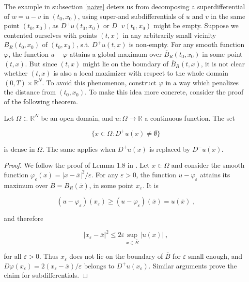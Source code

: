 The example in subsection \ref{naive} deters us from decomposing a superdifferential of $ w = u - v $ in $ (t_0, x_0) $, using super-and subdifferentials of $ u $ and $ v $ in the same point $ (t_0, x_0) $, as $ D^{+}u(t_0, x_0) $ or $ D^{-}v(t_0, x_0) $ might be empty. Suppose we contented ourselves with points $ (t, x) $ in any arbitrarily small vicinity $ B_R(t_0, x_0) $ of $ (t_0, x_0) $, s.t. $ D^{+}u(t, x) $ is non-empty. For any smooth function $ \varphi $, the function $ u - \varphi $ attains a global maximum over $ \overline{B}_R(t_0, x_0) $ in some point $ (t, x) $. But since $ (t, x) $ might lie on the boundary of $ \overline{B}_R(t, x) $, it is not clear whether $ (t, x) $ is also a local maximizer with respect to the whole domain $ \left( 0, T \right) \times \mathbb{R}^{N} $. To avoid this phenomenon, construct $ \varphi $ in a way which penalizes the distance from $ (t_0, x_0) $. To make this idea more concrete, consider the proof of the following theorem.
		
		\begin{theorem}
			\label{density}
			Let $ \Omega \subset \mathbb{R}^{N} $ be an open domain, and $ u : \Omega \to \mathbb{R} $ a continuous function. The set
			
			\begin{equation*}
				\big\{ x \in \Omega : D^{+}u(x) \neq \emptyset \big\}
			\end{equation*}
			
			is dense in $ \Omega $. The same applies when $ D^{+}u(x) $ is replaced by $ D^{-}u(x) $.
			
			\begin{proof}
				We follow the proof of Lemma 1.8 in \cite[p.~30]{bardi2008optimal}. Let $ \overline{x} \in \Omega $ and consider the smooth function $ \varphi_{\varepsilon}(x) = \lvert x - \overline{x} \rvert^2 /  \varepsilon $. For any $ \varepsilon > 0 $, the function $ u - \varphi_{\varepsilon} $ attains its maximum over $ \overline{B} = \overline{B}_R(\overline{x}) $, in some point $ x_{\varepsilon} $. It is
				
				\begin{equation*}
					(u - \varphi_{\varepsilon})(x_{\varepsilon}) \geq (u - \varphi_{\varepsilon})(\overline{x}) = u(\overline{x}) \ ,
				\end{equation*}
				
				and therefore
				
				\begin{equation*}
					\lvert x_{\varepsilon} - \overline{x} \rvert^2 \leq 2 \varepsilon \sup\limits_{x \in \overline{B}} \lvert u(x) \rvert  \ ,
				\end{equation*}
				
				for all $ \varepsilon > 0 $. Thus $ x_{\varepsilon} $ does not lie on the boundary of $ \overline{B} $ for $ \varepsilon $ small enough, and $ D\varphi(x_{\varepsilon}) = 2(x_{\varepsilon} - \overline{x}) / \varepsilon $ belongs to $ D^{+}u(x_{\varepsilon}) $. Similar arguments prove the claim for subdifferentials.
			\end{proof}
		\end{theorem}
	
